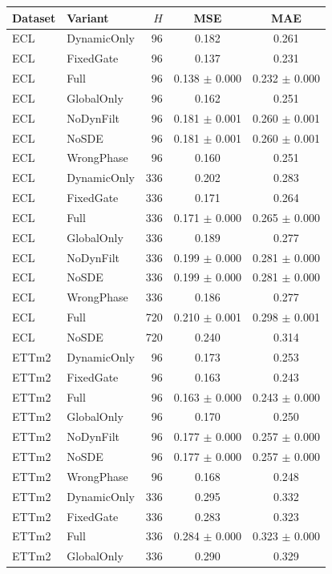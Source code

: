 \begin{tabular}{llrcc}
\toprule
Dataset & Variant & $H$ & MSE & MAE \\
\midrule
ECL & DynamicOnly & 96 & 0.182 & 0.261 \\
ECL & FixedGate & 96 & 0.137 & 0.231 \\
ECL & Full & 96 & 0.138 $\pm$ 0.000 & 0.232 $\pm$ 0.000 \\
ECL & GlobalOnly & 96 & 0.162 & 0.251 \\
ECL & NoDynFilt & 96 & 0.181 $\pm$ 0.001 & 0.260 $\pm$ 0.001 \\
ECL & NoSDE & 96 & 0.181 $\pm$ 0.001 & 0.260 $\pm$ 0.001 \\
ECL & WrongPhase & 96 & 0.160 & 0.251 \\
ECL & DynamicOnly & 336 & 0.202 & 0.283 \\
ECL & FixedGate & 336 & 0.171 & 0.264 \\
ECL & Full & 336 & 0.171 $\pm$ 0.000 & 0.265 $\pm$ 0.000 \\
ECL & GlobalOnly & 336 & 0.189 & 0.277 \\
ECL & NoDynFilt & 336 & 0.199 $\pm$ 0.000 & 0.281 $\pm$ 0.000 \\
ECL & NoSDE & 336 & 0.199 $\pm$ 0.000 & 0.281 $\pm$ 0.000 \\
ECL & WrongPhase & 336 & 0.186 & 0.277 \\
ECL & Full & 720 & 0.210 $\pm$ 0.001 & 0.298 $\pm$ 0.001 \\
ECL & NoSDE & 720 & 0.240 & 0.314 \\
\midrule
ETTm2 & DynamicOnly & 96 & 0.173 & 0.253 \\
ETTm2 & FixedGate & 96 & 0.163 & 0.243 \\
ETTm2 & Full & 96 & 0.163 $\pm$ 0.000 & 0.243 $\pm$ 0.000 \\
ETTm2 & GlobalOnly & 96 & 0.170 & 0.250 \\
ETTm2 & NoDynFilt & 96 & 0.177 $\pm$ 0.000 & 0.257 $\pm$ 0.000 \\
ETTm2 & NoSDE & 96 & 0.177 $\pm$ 0.000 & 0.257 $\pm$ 0.000 \\
ETTm2 & WrongPhase & 96 & 0.168 & 0.248 \\
ETTm2 & DynamicOnly & 336 & 0.295 & 0.332 \\
ETTm2 & FixedGate & 336 & 0.283 & 0.323 \\
ETTm2 & Full & 336 & 0.284 $\pm$ 0.000 & 0.323 $\pm$ 0.000 \\
ETTm2 & GlobalOnly & 336 & 0.290 & 0.329 \\

\end{tabular}
